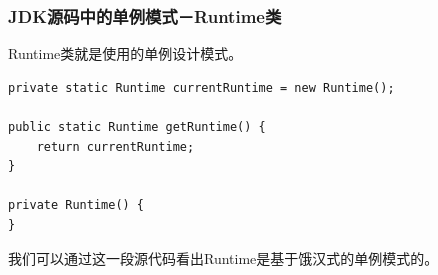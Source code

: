 \documentclass[11pt]{article}
\begin{document}
\subsubsection{JDK源码中的单例模式－Runtime类}
\label{sec:org48ff852}
Runtime类就是使用的单例设计模式。
\begin{verbatim}
private static Runtime currentRuntime = new Runtime();

public static Runtime getRuntime() {
    return currentRuntime;
}

private Runtime() {
}

\end{verbatim}
我们可以通过这一段源代码看出Runtime是基于饿汉式的单例模式的。
\end{document}
